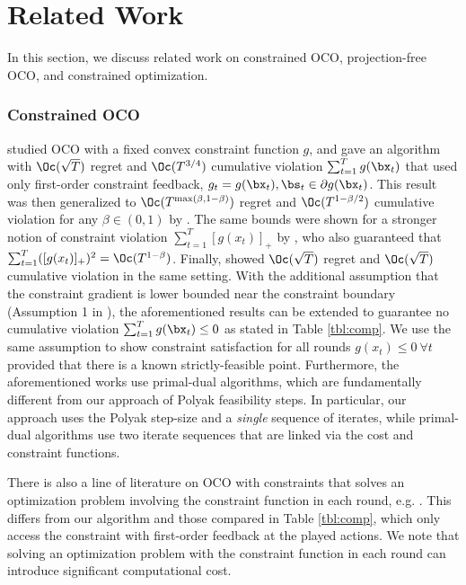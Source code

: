 \section{Related Work}
\label{sec:rel_work}

In this section, we discuss related work on constrained OCO, projection-free OCO, and constrained optimization.

\subsubsection{Constrained OCO}

\citet{mahdavi2012trading} studied OCO with a fixed convex constraint function $g$, and gave an algorithm with $\Oc(\sqrt{T})$ regret and $\Oc(T^{3/4})$ cumulative violation $\sum_{t=1}^T g(\bx_t)$ that used only first-order constraint feedback, $g_t = g(\bx_t), \bs_t \in \partial g(\bx_t)$.
This result was then generalized to $\Oc(T^{\max(\beta,1-\beta)})$ regret and $\Oc(T^{1 - \beta/2})$ cumulative violation for any $\beta \in (0,1)$ by \citet{jenatton2016adaptive}.
The same bounds were shown for a stronger notion of constraint violation $\sum_{t=1}^T [g(x_t)]_+$ by \citet{yuan2018online}, who also guaranteed that $\sum_{t=1}^T ([g(x_t)]_+)^2 = \Oc(T^{1 - \beta})$.
Finally, \citet{yu2017online} showed $\Oc(\sqrt{T})$ regret and $\Oc(\sqrt{T})$ cumulative violation in the same setting.
With the additional assumption that the constraint gradient is lower bounded near the constraint boundary (Assumption 1 in \citet{mahdavi2012trading}), the aforementioned results can be extended to guarantee no cumulative violation $\sum_{t=1}^T g(\bx_t) \leq 0$ as stated in Table \ref{tbl:comp}.
We use the same assumption to show constraint satisfaction for all rounds $g(x_t) \leq 0\ \forall t$ provided that there is a known strictly-feasible point.
Furthermore, the aforementioned works use primal-dual algorithms, which are fundamentally different from our approach of Polyak feasibility steps.
In particular, our approach uses the Polyak step-size and a \emph{single} sequence of iterates, while primal-dual algorithms use two iterate sequences that are linked via the cost and constraint functions.

There is also a line of literature on OCO with constraints that solves an optimization problem involving the constraint function in each round, e.g. \cite{yu2020low,yi2021regret,yi2022regret,guo2022online}.
This differs from our algorithm and those compared in Table \ref{tbl:comp}, which only access the constraint with first-order feedback at the played actions.
We note that solving an optimization problem with the constraint function in each round can introduce significant computational cost.

